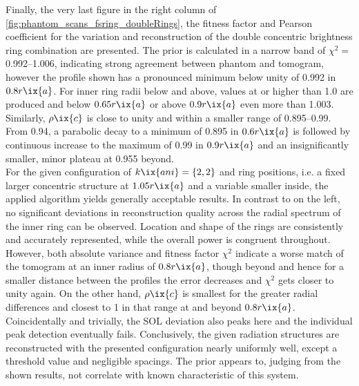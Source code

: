                 Finally, the very last figure in the right column of \cref{fig:phantom_scans_fsring_doubleRings}, the fitness factor and Pearson coefficient for the variation and reconstruction of the double concentric brightness ring combination are presented. The prior is calculated in a narrow band of $\chi^{2}=$\SIrange{0.992}{1.006}{\arbitraryunit}, indicating strong agreement between phantom and tomogram, however the profile shown has a pronounced minimum below unity of \SI{0.992}{\arbitraryunit} in $0.8r\ix{a}$. For inner ring radii below and above, values at or higher than \SI{1.0}{\arbitraryunit} are produced and below $0.65r\ix{a}$ or above $0.9r\ix{a}$ even more than \SI{1.003}{\arbitraryunit}. Similarly, $\rho\ix{c}$ is close to unity and within a smaller range of \SIrange{0.895}{0.99}{\arbitraryunit}. From \SI{0.94}{\arbitraryunit}, a parabolic decay to a minimum of \SI{0.895}{\arbitraryunit} in $0.6r\ix{a}$ is followed by continuous increase to the maximum of \SI{0.99}{\arbitraryunit} in $0.9r\ix{a}$ and an insignificantly smaller, minor plateau at \SI{0.955}{\arbitraryunit} beyond.\\%
                For the given configuration of $k\ix{ani}=\left\{2, 2\right\}$ and ring positions, i.e. a fixed larger concentric structure at $1.05r\ix{a}$ and a variable smaller inside, the applied algorithm yields generally acceptable results. In contrast to on the left, no significant deviations in reconstruction quality across the radial spectrum of the inner ring can be observed. Location and shape of the rings are consistently and accurately represented, while the overall power is congruent throughout. However, both absolute variance and fitness factor $\chi^{2}$ indicate a worse match of the tomogram at an inner radius of $0.8r\ix{a}$, though beyond and hence for a smaller distance between the profiles the error decreases and $\chi^{2}$ gets closer to unity again. On the other hand, $\rho\ix{c}$ is smallest for the greater radial differences and closest to \SI{1}{\arbitraryunit} in that range at and beyond $0.8r\ix{a}$. Coincidentally and trivially, the SOL deviation also peaks here and the individual peak detection eventually fails. Conclusively, the given radiation structures are reconstructed with the presented configuration nearly uniformly well, except a threshold value and negligible spacings. The prior appears to, judging from the shown results, not correlate with known characteristic of this system.%
%
